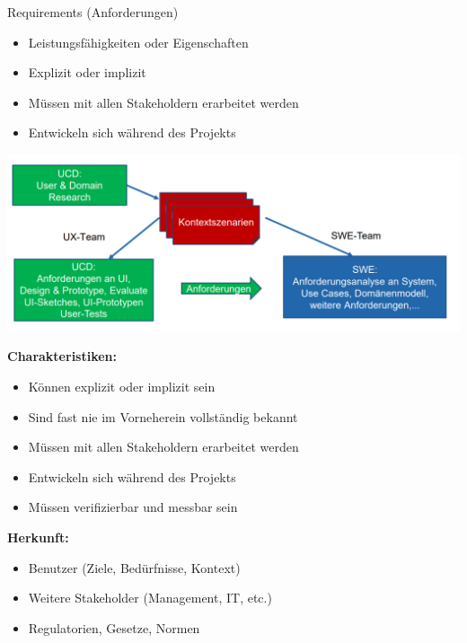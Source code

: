 \begin{definition}{Requirements (Anforderungen)}
\begin{itemize}
    \item Leistungsfähigkeiten oder Eigenschaften
    \item Explizit oder implizit
    \item Müssen mit allen Stakeholdern erarbeitet werden
    \item Entwickeln sich während des Projekts
\end{itemize}
\includegraphics[width=\linewidth]{images/user_anforderungen.png}

\textbf{Charakteristiken:}
\begin{itemize}
    \item Können explizit oder implizit sein
    \item Sind fast nie im Vorneherein vollständig bekannt
    \item Müssen mit allen Stakeholdern erarbeitet werden
    \item Entwickeln sich während des Projekts
    \item Müssen verifizierbar und messbar sein
\end{itemize}

\textbf{Herkunft:}
\begin{itemize}
    \item Benutzer (Ziele, Bedürfnisse, Kontext)
    \item Weitere Stakeholder (Management, IT, etc.)
    \item Regulatorien, Gesetze, Normen
\end{itemize}
\end{definition}





